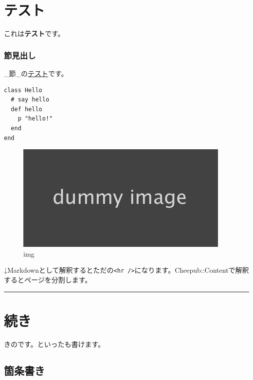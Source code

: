 \chapter*{テスト}\hypertarget{テスト}{}\label{テスト}

これは\textbf{テスト}です。

\subsection*{節見出し}\hypertarget{節見出し}{}\label{節見出し}

\_節\_の\href{https://example.jp/}{テスト}です。

\begin{verbatim}class Hello
  # say hello
  def hello
    p "hello!"
  end
end
\end{verbatim}

\begin{figure}
\begin{center}
\includegraphics{img/dummy.png}
\end{center}
\caption{img}

\end{figure}

↓Markdownとして解釈するとただの\texttt{\textless{}hr /\textgreater{}}になります。Cheepub::Contentで解釈するとページを分割します。

\begin{center}
\rule{3in}{0.4pt}
\end{center}

\chapter*{続き}\hypertarget{続き}{}\label{続き}

きのです。といったも書けます。

\section*{箇条書き}\hypertarget{箇条書き}{}\label{箇条書き}

